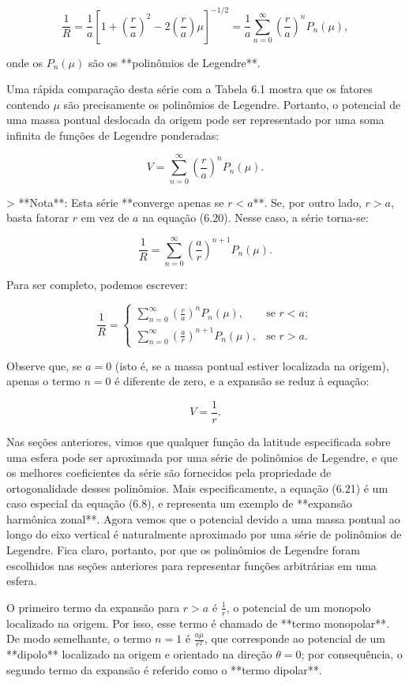 $$
\frac{1}{R} = \frac{1}{a} \left[1 + \left(\frac{r}{a}\right)^2 - 2\left(\frac{r}{a}\right)\mu \right]^{-1/2}
= \frac{1}{a} \sum_{n=0}^{\infty} \left(\frac{r}{a}\right)^n P_n(\mu),
$$

onde os $P_n(\mu)$ são os **polinômios de Legendre**.

Uma rápida comparação desta série com a Tabela 6.1 mostra que os fatores contendo $\mu$ são precisamente os polinômios de Legendre. Portanto, o potencial de uma massa pontual deslocada da origem pode ser representado por uma soma infinita de funções de Legendre ponderadas:

$$
V = \sum_{n=0}^{\infty} \left( \frac{r}{a} \right)^n P_n(\mu). \tag{6.21}
$$

> **Nota**: Esta série **converge apenas se $r < a$**. Se, por outro lado, $r > a$, basta fatorar $r$ em vez de $a$ na equação (6.20). Nesse caso, a série torna-se:

$$
\frac{1}{R} = \sum_{n=0}^{\infty} \left( \frac{a}{r} \right)^{n+1} P_n(\mu).
$$

Para ser completo, podemos escrever:

$$
\frac{1}{R} =
\begin{cases}
\sum_{n=0}^{\infty} \left( \frac{r}{a} \right)^n P_n(\mu), & \text{se } r < a; \\
\sum_{n=0}^{\infty} \left( \frac{a}{r} \right)^{n+1} P_n(\mu), & \text{se } r > a.
\end{cases}
$$

Observe que, se $a = 0$ (isto é, se a massa pontual estiver localizada na origem), apenas o termo $n = 0$ é diferente de zero, e a expansão se reduz à equação:

$$
V = \frac{1}{r}.
$$

Nas seções anteriores, vimos que qualquer função da latitude especificada sobre uma esfera pode ser aproximada por uma série de polinômios de Legendre, e que os melhores coeficientes da série são fornecidos pela propriedade de ortogonalidade desses polinômios. Mais especificamente, a equação (6.21) é um caso especial da equação (6.8), e representa um exemplo de **expansão harmônica zonal**. Agora vemos que o potencial devido a uma massa pontual ao longo do eixo vertical é naturalmente aproximado por uma série de polinômios de Legendre. Fica claro, portanto, por que os polinômios de Legendre foram escolhidos nas seções anteriores para representar funções arbitrárias em uma esfera.

O primeiro termo da expansão para $r > a$ é $\frac{1}{r}$, o potencial de um monopolo localizado na origem. Por isso, esse termo é chamado de **termo monopolar**. De modo semelhante, o termo $n = 1$ é $\frac{a \mu}{r^2}$, que corresponde ao potencial de um **dipolo** localizado na origem e orientado na direção $\theta = 0$; por consequência, o segundo termo da expansão é referido como o **termo dipolar**.

